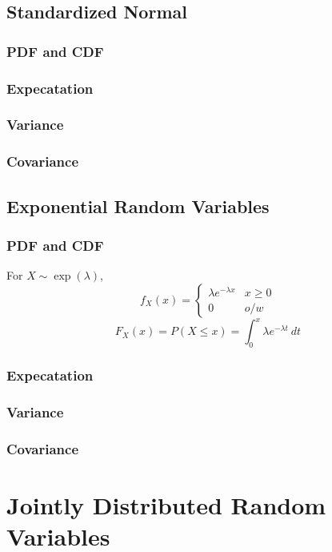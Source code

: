 \documentclass{amsart}
\begin{document}
			\subsection{Standardized Normal}
				\subsubsection{PDF and CDF}
					
				\subsubsection{Expecatation}
					
				\subsubsection{Variance}
				
				\subsubsection{Covariance}
				
			\subsection{Exponential Random Variables}
				\subsubsection{PDF and CDF}
				For $X \sim \exp(\lambda)$,
					$$
						f_{X}(x) = \begin{cases} \lambda e^{-\lambda x} & x \geq 0 \\ 0 & o/w \end{cases}
					$$
					$$
						F_{X}(x) = P(X \leq x) = \int_{0}^{x} \lambda e^{-\lambda t} \ dt
					$$
					
				\subsubsection{Expecatation}
					
				\subsubsection{Variance}
				
				\subsubsection{Covariance}
				
		\section{Jointly Distributed Random Variables}
\end{document}

